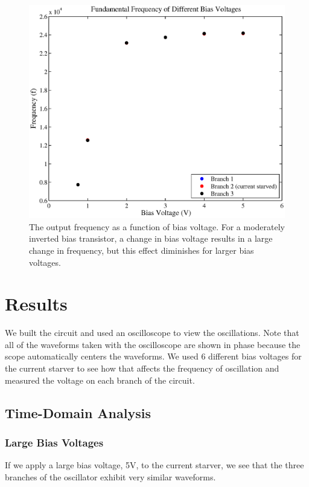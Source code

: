 \documentclass{article}
\begin{document}
\begin{figure}[H]
\centering
\includegraphics[scale=.7]{biasFrequenciesSim.eps}
\caption{The output frequency as a function of bias voltage. For a moderately inverted bias transistor, a change in bias voltage results in a large change in frequency, but this effect diminishes for larger bias voltages.}
\label{biasFrequenciesSim}
\end{figure}

\section*{Results}

We built the circuit and used an oscilloscope to view the oscillations. Note that all of the waveforms taken with the oscilloscope are shown in phase because the scope automatically centers the waveforms. We used 6 different bias voltages for the current starver to see how that affects the frequency of oscillation and measured the voltage on each branch of the circuit.

\subsection*{Time-Domain Analysis}

\subsubsection*{Large Bias Voltages}

If we apply a large bias voltage, 5V, to the current starver, we see that the three branches of the oscillator exhibit very similar waveforms.
\end{document}

